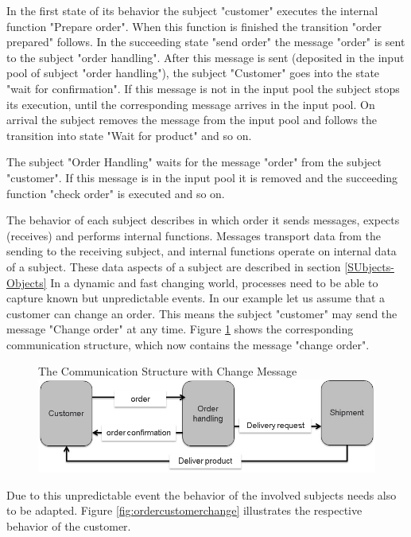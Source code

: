 In the first state of its behavior the subject "customer" executes the internal function "Prepare order". When this function is finished the transition "order prepared" follows. In the succeeding state "send order" the message "order" is sent to the subject "order handling". After this message is sent (deposited in the input pool of subject "order handling"), the subject "Customer" goes into the state "wait for confirmation". If this message is not in the input pool the subject stops its execution, until the corresponding message arrives in the input pool. On arrival the subject removes the message from the input pool and follows the transition into state "Wait for product" and so on.

The subject "Order Handling" waits for the message "order" from the subject "customer". If this message is in the input pool it is removed and the succeeding function "check order" is executed and so on.

The behavior of each subject describes in which order it sends messages, expects (receives) and performs internal functions. Messages transport data from the sending to the receiving subject, and internal functions operate on internal data of a subject. These data aspects of a subject are described in section \ref{SUbjects-Objects} In a dynamic and fast changing world, processes need to  be able to capture known but unpredictable events. In our example let us assume that a customer can change an order. This means the subject "customer" may send the message "Change order" at any time. Figure \ref{fig:ordercomstructure} shows the corresponding communication structure, which now contains the message "change order".

\strictpagecheck
\begin{figure}[htbp]
	\begin{sidecaption}{The Communication Structure with Change Message}
	\centering
	\includegraphics[width=0.7\linewidth]{20181026-Ontologie-Bilder/Grafiken-Ontologie/SUbjectExecution/OrderComStructure}
	\end{sidecaption}
	\label{fig:ordercomstructure}
\end{figure}

Due to this unpredictable event the behavior of the involved subjects needs also to be adapted. Figure \ref{fig:ordercustomerchange} illustrates the respective behavior of the customer. 

